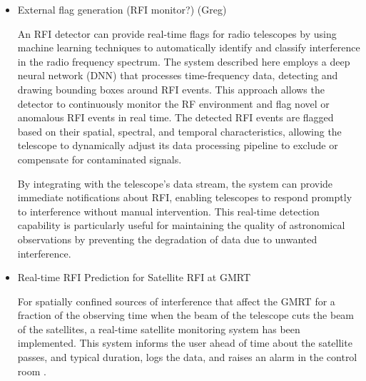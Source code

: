 \begin{itemize}
\item External flag generation (RFI monitor?) (Greg)

An RFI detector can provide real-time flags for radio telescopes by using machine learning techniques to automatically identify and classify interference in the radio frequency spectrum. The system described here \cite{9111666} employs a deep neural network (DNN) that processes time-frequency data, detecting and drawing bounding boxes around RFI events. This approach allows the detector to continuously monitor the RF environment and flag novel or anomalous RFI events in real time. The detected RFI events are flagged based on their spatial, spectral, and temporal characteristics, allowing the telescope to dynamically adjust its data processing pipeline to exclude or compensate for contaminated signals.

By integrating with the telescope’s data stream, the system can provide immediate notifications about RFI, enabling telescopes to respond promptly to interference without manual intervention. This real-time detection capability is particularly useful for maintaining the quality of astronomical observations by preventing the degradation of data due to unwanted interference.

\item Real-time RFI Prediction for Satellite RFI at GMRT

For spatially confined sources of interference that affect the GMRT for a fraction of the observing time when the beam of the telescope cuts the beam of the satellites, a real-time satellite monitoring system has been implemented. This system informs the user ahead of time about the satellite passes, and typical duration, logs the data, and raises an alarm in the control room \cite{raybole2016real}.



\end{itemize}
